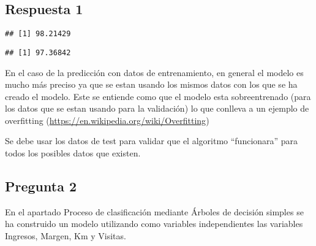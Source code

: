 \documentclass[]{article}
\newenvironment{Shaded}{\begin{snugshade}}{\end{snugshade}}
\newcommand{\KeywordTok}[1]{\textcolor[rgb]{0.94,0.87,0.69}{#1}}
\newcommand{\DecValTok}[1]{\textcolor[rgb]{0.86,0.86,0.80}{#1}}
\newcommand{\StringTok}[1]{\textcolor[rgb]{0.80,0.58,0.58}{#1}}
\newcommand{\CommentTok}[1]{\textcolor[rgb]{0.50,0.62,0.50}{#1}}
\newcommand{\OperatorTok}[1]{\textcolor[rgb]{0.94,0.94,0.82}{#1}}
\newcommand{\NormalTok}[1]{\textcolor[rgb]{0.80,0.80,0.80}{#1}}
\begin{document}
\subsection{Respuesta 1}\label{respuesta-1}

\begin{Shaded}
\end{Shaded}

\begin{verbatim}
## [1] 98.21429
\end{verbatim}

\begin{Shaded}
\end{Shaded}

\begin{verbatim}
## [1] 97.36842
\end{verbatim}

En el caso de la predicción con datos de entrenamiento, en general el
modelo es mucho más preciso ya que se estan usando los mismos datos con
los que se ha creado el modelo. Este se entiende como que el modelo esta
sobreentrenado (para los datos que se estan usando para la validación)
lo que conlleva a un ejemplo de overfitting
(\url{https://en.wikipedia.org/wiki/Overfitting})

Se debe usar los datos de test para validar que el algoritmo
``funcionara'' para todos los posibles datos que existen.

\subsection{Pregunta 2}\label{pregunta-2}

En el apartado Proceso de clasificación mediante Árboles de decisión
simples se ha construido un modelo utilizando como variables
independientes las variables Ingresos, Margen, Km y Visitas.
\end{document}
